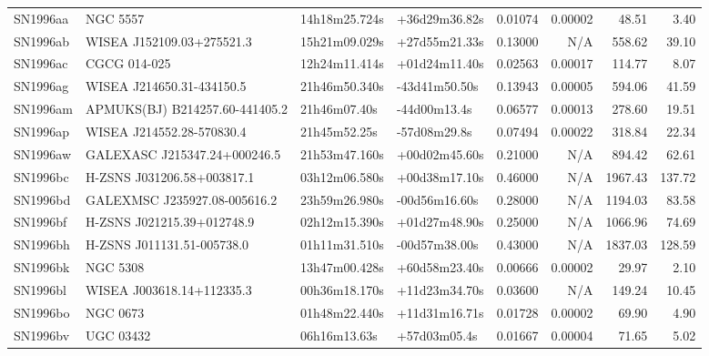 \begin{longtable}{llllrrrr}
SN1996aa         &                        NGC 5557 &   14h18m25.724s &   +36d29m36.82s &  0.01074 &  0.00002 &    48.51 &        3.40 \\
SN1996ab         &       WISEA J152109.03+275521.3 &   15h21m09.029s &   +27d55m21.33s &  0.13000 &      N/A &   558.62 &       39.10 \\
SN1996ac         &                    CGCG 014-025 &   12h24m11.414s &   +01d24m11.40s &  0.02563 &  0.00017 &   114.77 &        8.07 \\
SN1996ag         &       WISEA J214650.31-434150.5 &   21h46m50.340s &   -43d41m50.50s &  0.13943 &  0.00005 &   594.06 &       41.59 \\
SN1996am         &  APMUKS(BJ) B214257.60-441405.2 &    21h46m07.40s &    -44d00m13.4s &  0.06577 &  0.00013 &   278.60 &       19.51 \\
SN1996ap         &       WISEA J214552.28-570830.4 &    21h45m52.25s &    -57d08m29.8s &  0.07494 &  0.00022 &   318.84 &       22.34 \\
SN1996aw         &  GALEXASC J215347.24+000246.5   &   21h53m47.160s &   +00d02m45.60s &  0.21000 &      N/A &   894.42 &       62.61 \\
SN1996bc         &      H-ZSNS J031206.58+003817.1 &   03h12m06.580s &   +00d38m17.10s &  0.46000 &      N/A &  1967.43 &      137.72 \\
SN1996bd         &  GALEXMSC J235927.08-005616.2   &   23h59m26.980s &   -00d56m16.60s &  0.28000 &      N/A &  1194.03 &       83.58 \\
SN1996bf         &      H-ZSNS J021215.39+012748.9 &   02h12m15.390s &   +01d27m48.90s &  0.25000 &      N/A &  1066.96 &       74.69 \\
SN1996bh         &      H-ZSNS J011131.51-005738.0 &   01h11m31.510s &   -00d57m38.00s &  0.43000 &      N/A &  1837.03 &      128.59 \\
SN1996bk         &                        NGC 5308 &   13h47m00.428s &   +60d58m23.40s &  0.00666 &  0.00002 &    29.97 &        2.10 \\
SN1996bl         &       WISEA J003618.14+112335.3 &   00h36m18.170s &   +11d23m34.70s &  0.03600 &      N/A &   149.24 &       10.45 \\
SN1996bo         &                        NGC 0673 &   01h48m22.440s &   +11d31m16.71s &  0.01728 &  0.00002 &    69.90 &        4.90 \\
SN1996bv         &                       UGC 03432 &    06h16m13.63s &    +57d03m05.4s &  0.01667 &  0.00004 &    71.65 &        5.02 \\

\end{longtable}
